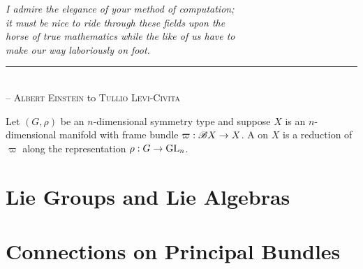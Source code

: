 \begin{flushleft}
	\textsl{I admire the elegance of your method of computation;}\\
	\textsl{it must be nice to ride through these fields upon the}\\
  \textsl{horse of true mathematics while the like of us have to}\\
  \textsl{make our way laboriously on foot.}\\
	\rule[0pt]{24em}{0.5pt}\\
	-- \textsc{Albert Einstein} to \textsc{Tullio Levi-Civita}\\
	\vspace{2em}
\end{flushleft}

\begin{definition}\label{defn:manifold_structure}
  Let $(G,\rho)$ be an $n$-dimensional symmetry type and suppose $X$ is an $n$-dimensional manifold with frame bundle $\varpi : \mathscr{B} X \to X$. A  on $X$ is a reduction of $\varpi$ along the representation $\rho : G \to {\operatorname{GL}}_n$.
\end{definition}

\section{Lie Groups and Lie Algebras}

\section{Connections on Principal Bundles}
